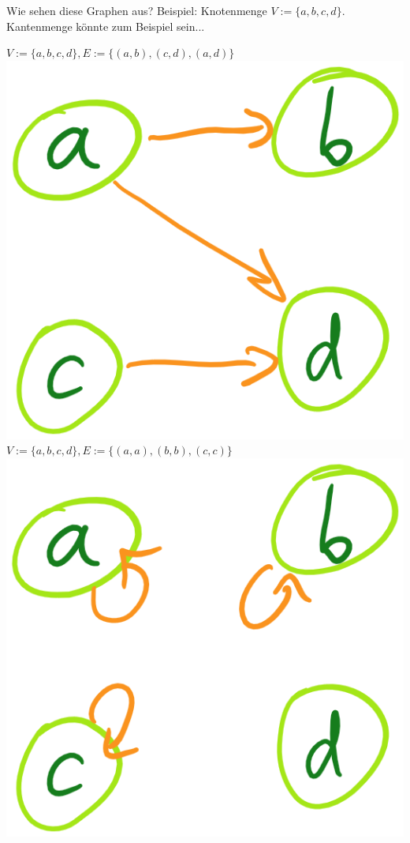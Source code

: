 \documentclass[handout]{beamer}
\begin{document}
\begin{frame}{Wie sehen diese Graphen aus?}
	Beispiel: Knotenmenge $V := \{a, b, c, d\}$. Kantenmenge könnte zum Beispiel sein...
	\begin{itemize}
		\pitem $V := \{a, b, c, d\}, E := \{(a,b), (c, d), (a, d)\}$\\
		\p\includegraphics[scale=0.17]{images/graph_0_01.png}
		\pitem $V := \{a, b, c, d\}, E := \{(a,a), (b,b), (c,c)\}$\\
		\p\includegraphics[scale=0.17]{images/graph_0_02.png}

\end{itemize}
\end{frame}
\end{document}
